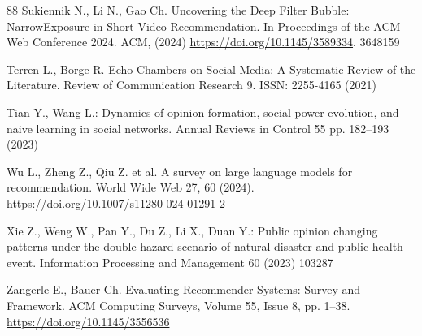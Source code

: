 \begin{thebibliography}{88}
Sukiennik N., Li N., Gao Ch. Uncovering the Deep Filter Bubble: NarrowExposure in Short-Video Recommendation. In Proceedings of the ACM Web Conference 2024. ACM, (2024) \url{https://doi.org/10.1145/3589334}.
3648159

Terren L., Borge R. Echo Chambers on Social Media: A Systematic Review of the Literature. Review of Communication Research 9. ISSN: 2255-4165 (2021)

 Tian Y., Wang L.: Dynamics of opinion formation, social power evolution, and naive learning in social networks. Annual Reviews in Control 55 pp. 182--193 (2023)

Wu L., Zheng Z., Qiu Z. et al. A survey on large language models for recommendation. World Wide Web 27, 60 (2024). \url{https://doi.org/10.1007/s11280-024-01291-2}

 Xie Z., Weng W., Pan Y., Du Z., Li X., Duan Y.: Public opinion changing patterns under the double-hazard scenario of natural disaster and public health event. Information Processing and Management 60 (2023) 103287

Zangerle E., Bauer Ch. Evaluating Recommender Systems: Survey and Framework. ACM Computing Surveys, Volume 55, Issue 8, pp. 1--38. 
\url{https://doi.org/10.1145/3556536}


\end{thebibliography}
